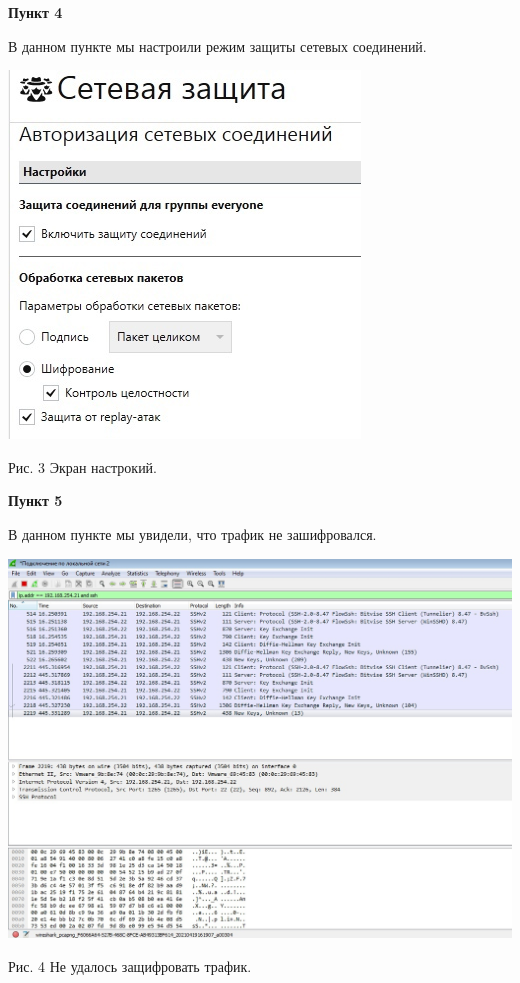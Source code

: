 \documentclass[a4paper,14pt]{extarticle}
\begin{document}
    \textbf{Пункт 4}
    \vspace{-3ex}
    \begin{center}
        \singlespacing
        В данном пункте мы настроили режим защиты сетевых соединений.

        \includegraphics[scale=0.6]{pics/4.jpg}

        Рис. 3 Экран настрокий.
    \end{center}

    \textbf{Пункт 5}
    \vspace{-3ex}
    \begin{center}
        \singlespacing
        В данном пункте мы увидели, что трафик не зашифровался.

        \includegraphics[scale=0.3]{pics/5.jpg}

        Рис. 4 Не удалось защифровать трафик.
    \end{center}
\end{document}

